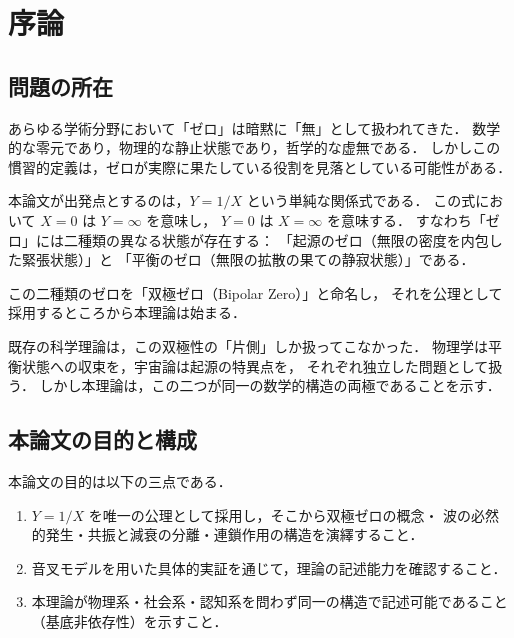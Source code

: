 \documentclass[12pt, a4paper]{article}
\theoremstyle{definition}
\begin{document}
\begin{titlepage}
\begin{abstract}
    本理論は物理系・社会系・認知系・制度系を問わず同一の構造で記述可能であり，
    既存の散逸構造論・カタストロフ理論・情報理論との差異を明示しつつ，
    それらを包摂する上位構造として位置づけられる．

    \vspace{0.5em}
    \noindent\textbf{キーワード：}
    双極ゼロ，波動構造，存在スイッチ，基底非依存性，開放系，球体モデル，普遍理論
  \end{abstract}
\end{titlepage}

\tableofcontents
\newpage

\section{序論}

\subsection{問題の所在}

あらゆる学術分野において「ゼロ」は暗黙に「無」として扱われてきた．
数学的な零元であり，物理的な静止状態であり，哲学的な虚無である．
しかしこの慣習的定義は，ゼロが実際に果たしている役割を見落としている可能性がある．

本論文が出発点とするのは，$Y = 1/X$ という単純な関係式である．
この式において $X = 0$ は $Y = \infty$ を意味し，
$Y = 0$ は $X = \infty$ を意味する．
すなわち「ゼロ」には二種類の異なる状態が存在する：
「起源のゼロ（無限の密度を内包した緊張状態）」と
「平衡のゼロ（無限の拡散の果ての静寂状態）」である．

この二種類のゼロを「双極ゼロ（Bipolar Zero）」と命名し，
それを公理として採用するところから本理論は始まる．

既存の科学理論は，この双極性の「片側」しか扱ってこなかった．
物理学は平衡状態への収束を，宇宙論は起源の特異点を，
それぞれ独立した問題として扱う．
しかし本理論は，この二つが同一の数学的構造の両極であることを示す．

\subsection{本論文の目的と構成}

本論文の目的は以下の三点である．

\begin{enumerate}
  \item $Y = 1/X$ を唯一の公理として採用し，そこから双極ゼロの概念・
        波の必然的発生・共振と減衰の分離・連鎖作用の構造を演繹すること．
  \item 音叉モデルを用いた具体的実証を通じて，理論の記述能力を確認すること．
  \item 本理論が物理系・社会系・認知系を問わず同一の構造で記述可能であること
        （基底非依存性）を示すこと．
\end{enumerate}
\end{document}
